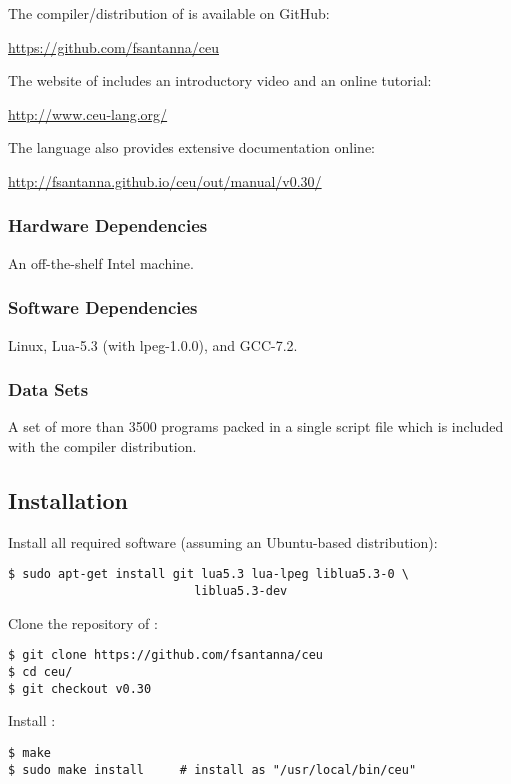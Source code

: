 {The compiler/distribution of \CEU is available on GitHub:

\url{https://github.com/fsantanna/ceu}

The website of \CEU includes an introductory video and an online tutorial:

\url{http://www.ceu-lang.org/}

The language also provides extensive documentation online:

\url{http://fsantanna.github.io/ceu/out/manual/v0.30/}

\subsubsection{Hardware Dependencies}

An off-the-shelf Intel machine.

\subsubsection{Software Dependencies}

Linux, Lua-5.3 (with lpeg-1.0.0), and GCC-7.2.

\subsubsection{Data Sets}

A set of more than 3500 programs packed in a single script file which is
included with the compiler distribution.

\subsection{Installation}

Install all required software (assuming an Ubuntu-based distribution):

\begin{verbatim}
$ sudo apt-get install git lua5.3 lua-lpeg liblua5.3-0 \
                          liblua5.3-dev
\end{verbatim}

Clone the repository of \CEU:

\begin{verbatim}
$ git clone https://github.com/fsantanna/ceu
$ cd ceu/
$ git checkout v0.30
\end{verbatim}

Install \CEU:

\begin{verbatim}
$ make
$ sudo make install     # install as "/usr/local/bin/ceu"
\end{verbatim}

}
